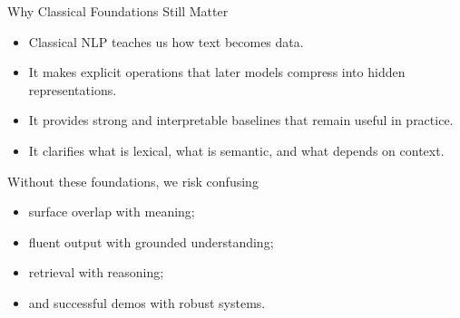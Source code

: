 \documentclass[aspectratio=169]{beamer}
\begin{document}
\begin{frame}{Why Classical Foundations Still Matter}
\begin{itemize}
    \item Classical NLP teaches us how text becomes data.
    \item It makes explicit operations that later models compress into hidden representations.
    \item It provides strong and interpretable baselines that remain useful in practice.
    \item It clarifies what is lexical, what is semantic, and what depends on context.
\end{itemize}

\vspace{0.15cm}
\begin{block}{Without these foundations, we risk confusing}
\begin{itemize}
    \item surface overlap with meaning;
    \item fluent output with grounded understanding;
    \item retrieval with reasoning;
    \item and successful demos with robust systems.
\end{itemize}
\end{block}
\end{frame}
%
\end{document}
